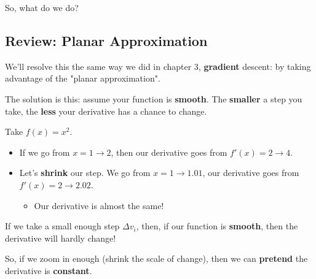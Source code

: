         So, what do we do?
    
    \secdiv
    
    \subsection{Review: Planar Approximation}
        
        We'll resolve this the same way we did in chapter 3, \textbf{gradient} descent: by taking advantage of the "planar approximation".
        
        The solution is this: assume your function is \textbf{smooth}. The \textbf{smaller} a step you take, the \textbf{less} your derivative has a chance to change.
        
        \miniex Take $f(x)=x^2$. 
        
        \begin{itemize}
            \item If we go from $x=1\rightarrow2$, then our derivative goes from $f'(x)=2 \rightarrow 4$.
            
            \item Let's \textbf{shrink} our step. We go from $x=1\rightarrow1.01$, our derivative goes from $f'(x)=2 \rightarrow 2.02$.
                \begin{itemize}
                    \item Our derivative is almost the same!
                \end{itemize}
        \end{itemize}
        
        If we take a small enough step $\Delta v_i$, then, if our function is \textbf{smooth}, then the derivative will hardly change!
            
        So, if we zoom in enough (shrink the scale of change), then we can \textbf{pretend} the derivative is \textbf{constant}.\\
        

